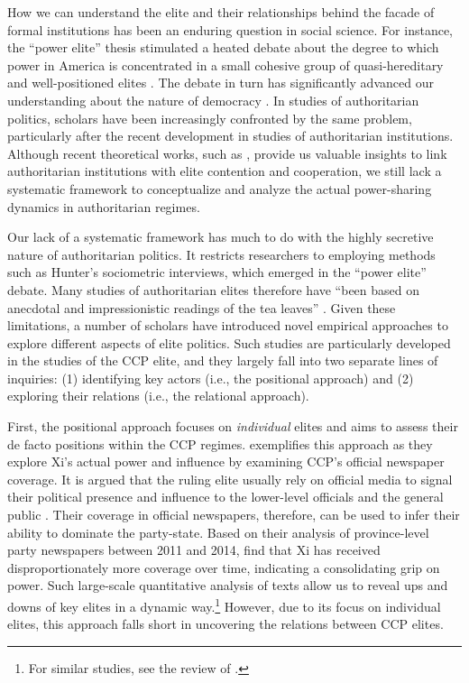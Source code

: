 \documentclass[11pt,english]{article}
\begin{document}
\begin{flushleft}
How we can understand the elite and their relationships behind the facade of formal institutions has been an enduring question in social science. For instance, the ``power elite'' thesis stimulated a heated debate about the degree to which power in America is concentrated in a small cohesive group of quasi-hereditary and well-positioned elites \citep{Hunter1953,Mills2000,Dahl1961}. The debate in turn has significantly advanced our understanding about the nature of democracy \citep[e.g.,][]{Dahl1971}. In studies of authoritarian politics, scholars have been increasingly confronted by the same problem, particularly after the recent development in studies of authoritarian institutions. Although recent theoretical works, such as \citet{Svolik2012}, provide us valuable insights to link authoritarian institutions with elite contention and cooperation, we still lack a systematic framework to conceptualize and analyze the actual power-sharing dynamics in authoritarian regimes.

Our lack of a systematic framework has much to do with the highly secretive nature of authoritarian politics. It restricts researchers to employing methods such as Hunter's \citeyearpar{Hunter1953} sociometric interviews, which emerged in the ``power elite'' debate. Many studies of authoritarian elites therefore have ``been based on anecdotal and impressionistic readings of the tea leaves'' \citep[p. 137]{Ishiyama2014}. Given these limitations, a number of scholars have introduced novel empirical approaches to explore different aspects of elite politics. Such studies are particularly developed in the studies of the CCP elite, and they largely fall into two separate lines of inquiries: (1) identifying key actors (i.e., the positional approach) and (2) exploring their relations (i.e., the relational approach).

First, the positional approach focuses on \emph{individual} elites and aims to assess their de facto positions within the CCP regimes. \citet{Jaros2017} exemplifies this approach as they explore Xi's actual power and influence by examining CCP's official newspaper coverage. It is argued that the ruling elite usually rely on official media to signal their political presence and influence to the lower-level officials and the general public \citep{Huang2015b}. Their coverage in official newspapers, therefore, can be used to infer their ability to dominate the party-state. Based on their analysis of province-level party newspapers between 2011 and 2014, \citet{Jaros2017} find that Xi has received disproportionately more coverage over time, indicating a consolidating grip on power. Such large-scale quantitative analysis of texts allow us to reveal ups and downs of key elites in a dynamic way.\footnote{For similar studies, see the review of \citet{Ban2018}.} However, due to its focus on individual elites, this approach falls short in uncovering the relations between CCP elites.


\end{flushleft}
\end{document}
